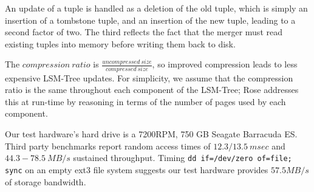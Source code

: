 \documentclass{vldb}
\newcommand{\rows}{Rose\xspace}
\begin{document}
An update of a tuple is handled as a deletion of the old tuple, which is simply an
insertion of a tombstone tuple, and an insertion of the new tuple, leading
to a second factor of two.  The third reflects the fact that the
merger must read existing tuples into memory before writing them back
to disk.

The $compression~ratio$ is
$\frac{uncompressed~size}{compressed~size}$, so improved compression
leads to less expensive LSM-Tree updates.  For simplicity, we assume
that the compression ratio is the same throughout each component of
the LSM-Tree; \rows addresses this at run-time by reasoning in terms
of the number of pages used by each component.

Our test hardware's hard drive is a 7200RPM, 750 GB Seagate Barracuda
ES.  
Third party
benchmarks\cite{hdBench} %
report random access times of $12.3/13.5~msec$ and $44.3-78.5~MB/s$
sustained throughput.  Timing {\tt dd if=/dev/zero of=file; sync} on an
empty ext3 file system suggests our test hardware provides $57.5MB/s$ of
storage bandwidth.

\end{document}
